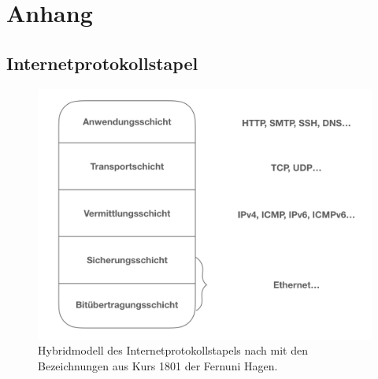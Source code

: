 \chapter{Anhang}
\section{Internetprotokollstapel}
\label{A1}
\begin{figure}[h]
\includegraphics[width=\linewidth]{protstap}
\caption{Hybridmodell des Internetprotokollstapels nach \cite{meinel2012grundlage} mit den Bezeichnungen aus Kurs 1801 der Fernuni Hagen.}
\end{figure}